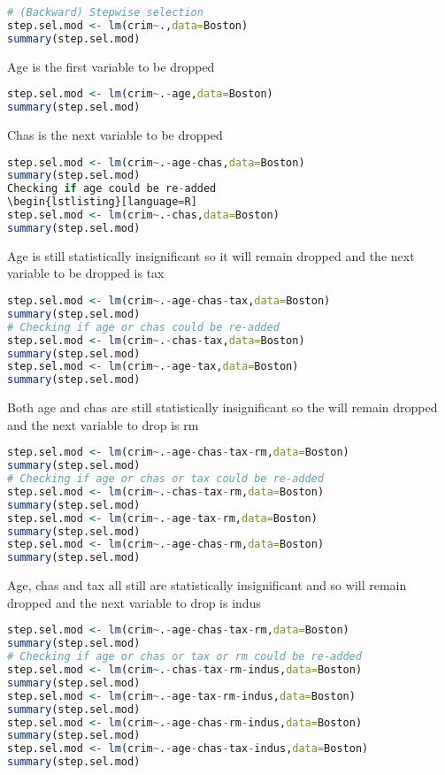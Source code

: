 \documentclass[11pt]{report}
\begin{document}
\begin{itemize}
\begin{lstlisting}[language=R]
# (Backward) Stepwise selection
step.sel.mod <- lm(crim~.,data=Boston)
summary(step.sel.mod)
\end{lstlisting}
Age is the first variable to be dropped
\begin{lstlisting}[language=R]
step.sel.mod <- lm(crim~.-age,data=Boston)
summary(step.sel.mod)
\end{lstlisting}
Chas is the next variable to be dropped
\begin{lstlisting}[language=R]
step.sel.mod <- lm(crim~.-age-chas,data=Boston)
summary(step.sel.mod)
Checking if age could be re-added
\begin{lstlisting}[language=R]
step.sel.mod <- lm(crim~.-chas,data=Boston)
summary(step.sel.mod)
\end{lstlisting}
Age is still statistically insignificant so it will remain dropped and the next variable to be dropped is tax
\begin{lstlisting}[language=R]
step.sel.mod <- lm(crim~.-age-chas-tax,data=Boston)
summary(step.sel.mod)
# Checking if age or chas could be re-added
step.sel.mod <- lm(crim~.-chas-tax,data=Boston)
summary(step.sel.mod)
step.sel.mod <- lm(crim~.-age-tax,data=Boston)
summary(step.sel.mod)
\end{lstlisting}
Both age and chas are still statistically insignificant so the will remain dropped and the next variable to drop is rm
\begin{lstlisting}[language=R]
step.sel.mod <- lm(crim~.-age-chas-tax-rm,data=Boston)
summary(step.sel.mod)
# Checking if age or chas or tax could be re-added
step.sel.mod <- lm(crim~.-chas-tax-rm,data=Boston)
summary(step.sel.mod)
step.sel.mod <- lm(crim~.-age-tax-rm,data=Boston)
summary(step.sel.mod)
step.sel.mod <- lm(crim~.-age-chas-rm,data=Boston)
summary(step.sel.mod)
\end{lstlisting}
Age, chas and tax all still are statistically insignificant and so will remain dropped and the next variable to drop is indus
\begin{lstlisting}[language=R]
step.sel.mod <- lm(crim~.-age-chas-tax-rm,data=Boston)
summary(step.sel.mod)
# Checking if age or chas or tax or rm could be re-added
step.sel.mod <- lm(crim~.-chas-tax-rm-indus,data=Boston)
summary(step.sel.mod)
step.sel.mod <- lm(crim~.-age-tax-rm-indus,data=Boston)
summary(step.sel.mod)
step.sel.mod <- lm(crim~.-age-chas-rm-indus,data=Boston)
summary(step.sel.mod)
step.sel.mod <- lm(crim~.-age-chas-tax-indus,data=Boston)
summary(step.sel.mod)
\end{lstlisting}

\end{itemize}
\end{document}
